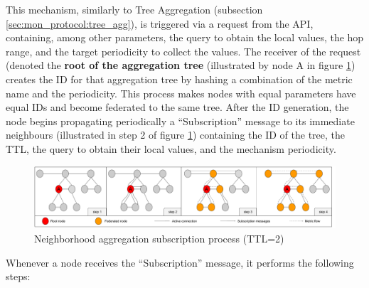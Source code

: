 This mechanism, similarly to Tree Aggregation (subsection \ref{sec:mon_protocol:tree_agg}), is triggered via a request from the API, containing, among other parameters, the query to obtain the local values, the hop range, and the target periodicity to collect the values. The receiver of the request (denoted the \textbf{root of the aggregation tree} (illustrated by node A in figure \ref{sec:mon_protocol:img:neigh_agg_sub}) creates the ID for that aggregation tree by hashing a combination of the metric name and the periodicity. This process makes nodes with equal parameters have equal IDs and become federated to the same tree. After the ID generation, the node begins propagating periodically a ``Subscription'' message to its immediate neighbours (illustrated in step 2 of figure \ref{sec:mon_protocol:img:neigh_agg_sub}) containing the ID of the tree, the TTL, the query to obtain their local values, and the mechanism periodicity. 

\begin{figure}[htbp]
    \centering
    \includegraphics[width=\textwidth]{Chapters/aggregation/images/neigh-agg-subscribe.pdf}
    \caption{Neighborhood aggregation subscription process (TTL=2)}
    \label{sec:mon_protocol:img:neigh_agg_sub}
\end{figure}
     
Whenever a node receives the ``Subscription'' message, it performs the following steps:

